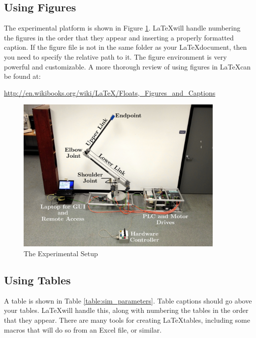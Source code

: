 \documentclass[11pt]{article}
\begin{document}
\subsection{Using Figures}
\label{sec:using_figures}
\vspace{-0.2in}
%
The experimental platform is shown in Figure \ref{fig:cherrypicker_labeled}. \LaTeX will handle numbering the figures in the order that they appear and inserting a properly formatted caption. 
If the figure file is not in the same folder as your \LaTeX document, then you need to specify the relative path to it. The figure environment is very powerful and customizable. A more thorough review of using figures in \LaTeX can be found at: 

\hspace{0.25in}\url{http://en.wikibooks.org/wiki/LaTeX/Floats,_Figures_and_Captions}
%

\begin{figure}[tbp]
\begin{center}
\includegraphics[width = 4in]{Cherrypicker_labeled}
\caption{The Experimental Setup}
\label{fig:cherrypicker_labeled}
\end{center}
\vspace{-0.2in}
\end{figure}
%

\subsection{Using Tables}
\label{sec:tables}
\vspace{-0.2in}
%
A table is shown in Table \ref{table:sim_parameters}. Table captions should go above your tables. \LaTeX will handle this, along with numbering the tables in the order that they appear. There are many tools for creating \LaTeX tables, including some macros that will do so from an Excel file, or similar. 
\end{document}
